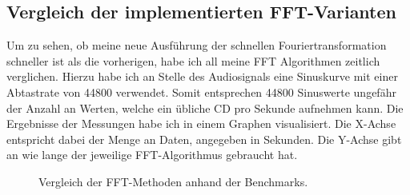 \documentclass[a4paper,12pt]{article}
\theoremstyle{definition}
\theoremstyle{remark}
\begin{document}
\subsection{Vergleich der implementierten FFT-Varianten}
Um zu sehen, ob meine neue Ausführung der schnellen Fouriertransformation schneller ist als die vorherigen, habe ich all meine FFT 
Algorithmen zeitlich verglichen. Hierzu habe ich an Stelle des Audiosignals eine Sinuskurve mit einer Abtastrate von 44800 verwendet. 
Somit entsprechen 44800 Sinuswerte ungefähr der Anzahl an Werten, welche ein übliche CD pro Sekunde aufnehmen kann. Die Ergebnisse der 
Messungen habe ich in einem Graphen visualisiert. Die X-Achse entspricht dabei der Menge an Daten, angegeben in Sekunden. Die Y-Achse 
gibt an wie lange der jeweilige FFT-Algorithmus gebraucht hat. 
\begin{figure}[H]
  \centering
  \caption{Vergleich der FFT-Methoden anhand der Benchmarks.}
\end{figure}
\end{document}
